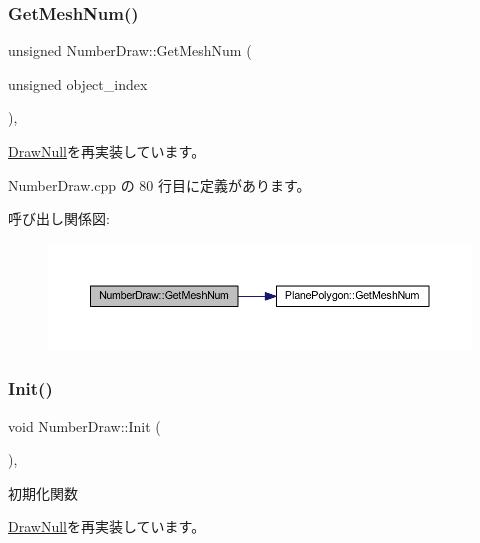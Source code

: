 \subsubsection{\texorpdfstring{Get\+Mesh\+Num()}{GetMeshNum()}}
{\footnotesize\ttfamily unsigned Number\+Draw\+::\+Get\+Mesh\+Num (\begin{DoxyParamCaption}\item[{unsigned}]{object\+\_\+index }\end{DoxyParamCaption})\hspace{0.3cm}{\ttfamily [override]}, {\ttfamily [virtual]}}



\mbox{\hyperlink{class_draw_null_ad735978a85a5f3583eecd82d6bfe6413}{Draw\+Null}}を再実装しています。



 Number\+Draw.\+cpp の 80 行目に定義があります。

呼び出し関係図\+:\nopagebreak
\begin{figure}[H]
\begin{center}
\leavevmode
\includegraphics[width=350pt]{class_number_draw_a8234fb06d885feaa8a2f0ecf256db9a0_cgraph}
\end{center}
\end{figure}
\mbox{\label{class_number_draw_ad52c1e8b9ae6e830a82c440cc18cb6c9}} 
\subsubsection{\texorpdfstring{Init()}{Init()}}
{\footnotesize\ttfamily void Number\+Draw\+::\+Init (\begin{DoxyParamCaption}{ }\end{DoxyParamCaption})\hspace{0.3cm}{\ttfamily [override]}, {\ttfamily [virtual]}}



初期化関数 



\mbox{\hyperlink{class_draw_null_acd7fef3ccea1da537ac9507ffbb6dd2e}{Draw\+Null}}を再実装しています。



